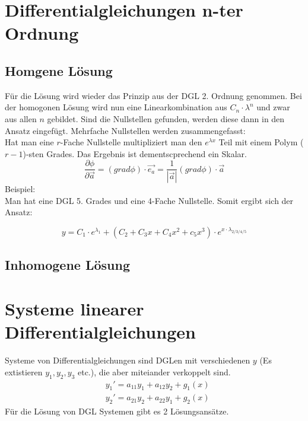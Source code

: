 \documentclass[a4paper,10pt]{scrartcl}
\begin{document}
        \section{Differentialgleichungen n-ter Ordnung}
        \subsection*{Homgene Lösung}
        
        Für die Lösung wird wieder das Prinzip aus der DGL 2. Ordnung genommen. Bei der homogonen Lösung wird nun eine Linearkombination aus \(C_n \cdot \lambda^n \) und 
        zwar aus allen \(n\) gebildet. Sind die Nullstellen gefunden, werden diese dann in den Ansatz eingefügt. Mehrfache Nullstellen werden zusammengefasst: \\
        Hat man eine \(r\)-Fache Nullstelle multipliziert man den \(e^{\lambda x}\) Teil mit einem Polym (\(r-1\))-sten Grades. Das Ergebnis ist dementscprechend ein Skalar. 
        \begin{equation*}
            \frac{\partial \phi}{\partial \vec{a}} = (grad \phi) \cdot \vec{e_a} = \frac{1}{|\vec{a}|} (grad \phi) \cdot \vec{a}
        \end{equation*} Beispiel: \\
        Man hat eine DGL 5. Grades und eine 4-Fache Nullstelle. Somit ergibt sich der Ansatz: 

        \begin{equation}
            y = C_1 \cdot e^{\lambda_1} + (C_2 + C_3x + C_4x^2 + c_5x^3) \cdot e^{x \cdot \lambda_{2/3/4/5}}
        \end{equation}   

        \subsection*{Inhomogene Lösung}

        \section{Systeme linearer Differentialgleichungen}
        Systeme von Differentialgleichungen sind DGLen mit verschiedenen \(y\) (Es extistieren  \(y_1, y_2, y_3\) etc.), die aber miteiander verkoppelt sind.
        \begin{equation*}
            \begin{aligned}
                & y_1' = a_{11}y_1 + a_{12}y_2 + g_1(x) \\
                & y_2' = a_{21}y_2 + a_{22}y_1 + g_2(x)  
            \end{aligned}
        \end{equation*}
        Für die Lösung von DGL Systemen gibt es 2 Lösungsansätze.
\end{document}
